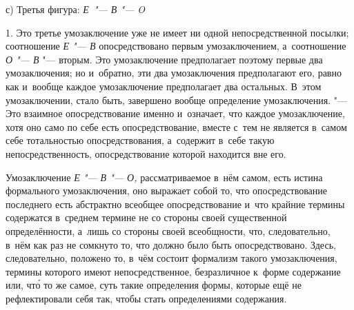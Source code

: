{с) Третья фигура: {\em Е~"--- В "--- O}}

1. Это третье умозаключение уже не имеет ни одной
непосредственной посылки; соотношение {\em Е "--- В}
опосредствовано первым умозаключением, а~соотношение
{\em О "--- В} "--- вторым. Это умозаключение предполагает поэтому первые два
умозаключения; но и~обратно, эти два умозаключения предполагают его, равно
как и~вообще каждое умозаключение предполагает два остальных. В~этом
умозаключении, стало быть, завершено вообще определение умозаключения.
"--- Это взаимное опосредствование именно и~означает, что каждое
умозаключение, хотя оно само по себе есть опосредствование, вместе с~тем не
является в~самом себе тотальностью опосредствования, а~содержит в~себе
такую непосредственность, опосредствование которой находится вне его.

Умозаключение {\em Е "--- В "--- О,} рассматриваемое в~нём
самом, есть истина формального умозаключения, оно выражает собой то, что
опосредствование последнего есть абстрактно всеобщее опосредствование и~что
крайние термины содержатся в~среднем термине не со стороны своей
существенной определённости, а~лишь со стороны своей всеобщности, что,
следовательно, в~нём как раз не сомкнуто то, что должно было быть
опосредствовано. Здесь, следовательно, положено то, в~чём состоит формализм
такого умозаключения, термины которого имеют
непосредственное, безразличное к~форме содержание или, чт\'{о} то же самое,
суть такие определения формы, которые ещё не рефлектировали себя так, чтобы
стать определениями содержания.

